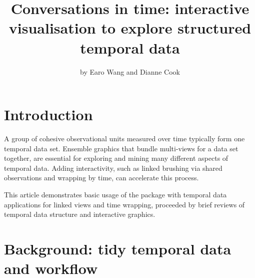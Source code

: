 \title{Conversations in time: interactive visualisation to explore structured
temporal data}
\author{by Earo Wang and Dianne Cook}

\maketitle


\hypertarget{introduction}{%
\section{Introduction}\label{introduction}}

A group of cohesive observational units measured over time typically
form one temporal data set. Ensemble graphics
\citep{unwin_ensemble_2018} that bundle multi-views for a data set
together, are essential for exploring and mining many different aspects
of temporal data. Adding interactivity, such as linked brushing via
shared observations and wrapping by time, can accelerate this process.

This article demonstrates basic usage of the 
package with temporal data applications for linked views and time
wrapping, proceeded by brief reviews of temporal data structure and
interactive graphics.

\hypertarget{background-tidy-temporal-data-and-workflow}{%
\section{Background: tidy temporal data and
workflow}\label{background-tidy-temporal-data-and-workflow}}

